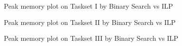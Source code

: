  \begin{figure}
\centering
{}
\caption{Peak memory plot on Taskset I by Binary Search vs ILP}
\end{figure}

\begin{figure} [!htb]
\centering
{}
\caption{Peak memory plot on Taskset II by Binary Search vs ILP}
\end{figure}

\begin{figure}
\centering
{}
\caption{Peak memory plot on Taskset III by Binary Search vs ILP}
\end{figure}



